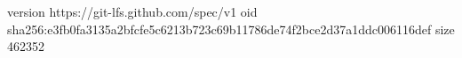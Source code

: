 version https://git-lfs.github.com/spec/v1
oid sha256:e3fb0fa3135a2bfcfe5c6213b723c69b11786de74f2bce2d37a1ddc006116def
size 462352
